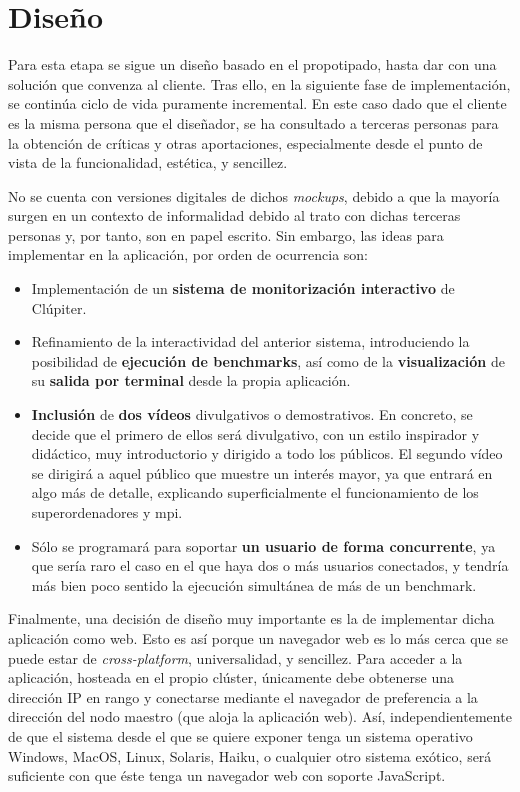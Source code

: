 \section{Diseño}
\label{sec:contenido_didactico__diseño}
Para esta etapa se sigue un diseño basado en el propotipado, hasta dar con una solución que convenza al cliente. Tras ello, en la siguiente fase de implementación, se continúa ciclo de vida puramente incremental. En este caso dado que el cliente es la misma persona que el diseñador, se ha consultado a terceras personas para la obtención de críticas y otras aportaciones, especialmente desde el punto de vista de la funcionalidad, estética, y sencillez.

No se cuenta con versiones digitales de dichos \textit{mockups}, debido a que la mayoría surgen en un contexto de informalidad debido al trato con dichas terceras personas y, por tanto, son en papel escrito. Sin embargo, las ideas para implementar en la aplicación, por orden de ocurrencia son:

\begin{itemize}
  \item Implementación de un \textbf{sistema de monitorización interactivo} de Clúpiter.
  \item Refinamiento de la interactividad del anterior sistema, introduciendo la posibilidad de \textbf{ejecución de benchmarks}, así como de la \textbf{visualización} de su \textbf{salida por terminal} desde la propia aplicación.
  \item \textbf{Inclusión} de \textbf{dos vídeos} divulgativos o demostrativos. En concreto, se decide que el primero de ellos será divulgativo, con un estilo inspirador y didáctico, muy introductorio y dirigido a todo los públicos. El segundo vídeo se dirigirá a aquel público que muestre un interés mayor, ya que entrará en algo más de detalle, explicando superficialmente el funcionamiento de los superordenadores y \acrshort{mpi}.
  \item Sólo se programará para soportar \textbf{un usuario de forma concurrente}, ya que sería raro el caso en el que haya dos o más usuarios conectados, y tendría más bien poco sentido la ejecución simultánea de más de un benchmark.
\end{itemize}

Finalmente, una decisión de diseño muy importante es la de implementar dicha aplicación como web. Esto es así porque un navegador web es lo más cerca que se puede estar de \textit{cross-platform}, universalidad, y sencillez. Para acceder a la aplicación, hosteada en el propio clúster, únicamente debe obtenerse una dirección IP en rango y conectarse mediante el navegador de preferencia a la dirección del nodo maestro (que aloja la aplicación web). Así, independientemente de que el sistema desde el que se quiere exponer tenga un sistema operativo Windows, MacOS, Linux, Solaris, Haiku, o cualquier otro sistema exótico, será suficiente con que éste tenga un navegador web con soporte JavaScript.

